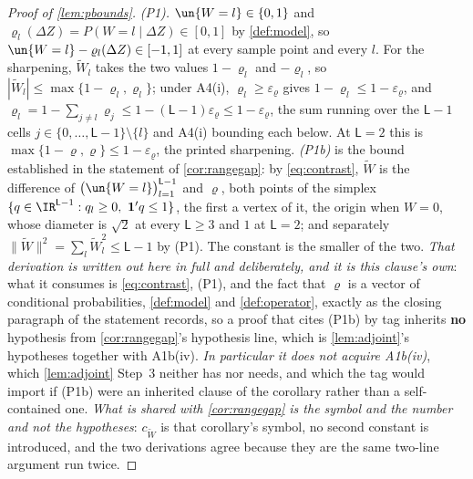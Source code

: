 \begin{proof}[Proof of \cref{lem:pbounds}]
\emph{\textup{(P1)}.} $\un\{W=l\}\in\{0,1\}$ and $\varrho_l(\Delta Z)=P(W=l\mid\Delta Z)\in[0,1]$ by
\cref{def:model}, so $\un\{W=l\}-\varrho_l(\Delta Z)\in[-1,1]$ at every sample point and every $l$. For
the sharpening, $\widetilde W_l$ takes the two values $1-\varrho_l$ and $-\varrho_l$, so
$|\widetilde W_l|\le\max\{1-\varrho_l,\varrho_l\}$; under A4(i), $\varrho_l\ge\varepsilon_\varrho$ gives
$1-\varrho_l\le1-\varepsilon_\varrho$, and
$\varrho_l=1-\sum_{j\ne l}\varrho_j\le1-(\mathsf L-1)\varepsilon_\varrho\le1-\varepsilon_\varrho$, the
sum running over the $\mathsf L-1$ cells $j\in\{0,\dots,\mathsf L-1\}\setminus\{l\}$ and A4(i) bounding
each below. At $\mathsf L=2$ this is $\max\{1-\varrho,\varrho\}\le1-\varepsilon_\varrho$, the
printed sharpening.
\emph{\textup{(P1b)}} is the bound established in the statement of \cref{cor:rangegap}: by
\eqref{eq:contrast}, $\widetilde W$ is the difference of $\big(\un\{W=l\}\big)_{l=1}^{\mathsf L-1}$ and
$\varrho$, both points of the simplex
$\{q\in\IR^{\mathsf L-1}:q_l\ge0,\ \mathbf 1'q\le1\}$, the first a vertex of it, the origin when
$W=0$, whose diameter is $\sqrt2$ at every
$\mathsf L\ge3$ and $1$ at $\mathsf L=2$; and separately
$\|\widetilde W\|^{2}=\sum_l\widetilde W_l^{2}\le\mathsf L-1$ by \textup{(P1)}. The constant is the
smaller of the two. \emph{That derivation is written out here in full and deliberately, and it is this
clause's own}: what it consumes is \eqref{eq:contrast}, \textup{(P1)}, and the fact that $\varrho$ is a
vector of conditional probabilities, \cref{def:model} and \cref{def:operator}, exactly as the closing
paragraph of the statement records, so a proof that cites \textup{(P1b)} by tag inherits \textbf{no}
hypothesis from \cref{cor:rangegap}'s hypothesis line, which is \cref{lem:adjoint}'s hypotheses together
with A1b(iv). \emph{In particular it does not acquire \textup{A1b(iv)}}, which \cref{lem:adjoint} Step~3
neither has nor needs, and which the tag would import if \textup{(P1b)} were an inherited clause of the
corollary rather than a self-contained one. \emph{What is shared with \cref{cor:rangegap} is the symbol
and the number and not the hypotheses}: $c_{\widetilde W}$ is that corollary's symbol, no second constant
is introduced, and the two derivations agree because they are the same two-line argument run twice.

\end{proof}
